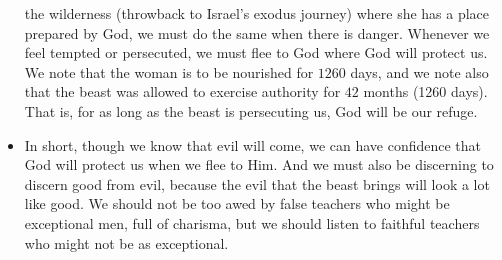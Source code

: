 \begin{itemize}
{  the wilderness (throwback to Israel's exodus journey) where she has a place
  prepared by God, we must do the same when there is danger. Whenever we feel tempted or persecuted, we must flee to God where God will protect us. We note that the woman is to be nourished for $1260$ days, and we note also that the beast was allowed to exercise authority for $42$ months (1260 days). That is, for as long as the beast is persecuting us, God will be our refuge. }
  \item{In short, though we know that evil will come, we can have confidence
  that God will protect us when we flee to Him.  And we must also be
  discerning to discern good from evil, because the evil that the beast
  brings will look a lot like good. We should not be too awed by false teachers who might be exceptional men, full of charisma, but we should listen to faithful teachers who might not be as exceptional.}

\end{itemize}